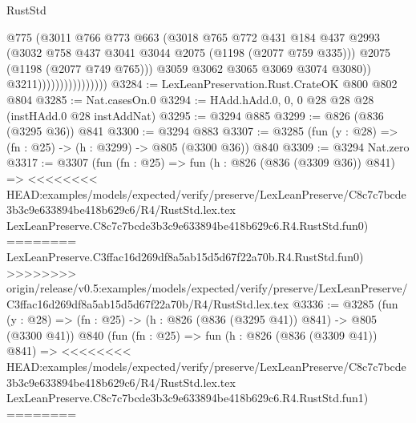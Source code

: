 \begin{lexlean}{RustStd}
\begin{coremodule}
{\begin{coremodule}
{{{{{{{{{                                      @775
                                      (@3011
                                        @766
                                        @773
                                        @663
                                        (@3018
                                          @765
                                          @772
                                          @431
                                          @184
                                          @437
                                          @2993
                                          (@3032
                                            @758
                                            @437
                                            @3041
                                            @3044
                                            @2075
                                            (@1198 (@2077 @759 @335)))
                                          @2075
                                          (@1198 (@2077 @749 @765)))
                                        @3059
                                        @3062
                                        @3065
                                        @3069
                                        @3074
                                        @3080))
                                    @3211))))))))))))))))
@3284 := LexLeanPreservation.Rust.CrateOK @800 @802 @804
@3285 := Nat.casesOn.{0}
@3294 := HAdd.hAdd.{0, 0, 0} @28 @28 @28 (instHAdd.{0} @28 instAddNat)
@3295 := @3294 @885
@3299 := @826 (@836 (@3295 @36)) @841
@3300 := @3294 @883
@3307 := @3285 (fun (y : @28) => (fn : @25) -> (h : @3299) -> @805 (@3300 @36)) @840
@3309 := @3294 Nat.zero
@3317 := @3307
    (fun (fn : @25) =>
    fun (h : @826 (@836 (@3309 @36)) @841) =>
<<<<<<<< HEAD:examples/models/expected/verify/preserve/LexLeanPreserve/C8c7c7bcde3b3c9e633894be418b629c6/R4/RustStd.lex.tex
    LexLeanPreserve.C8c7c7bcde3b3c9e633894be418b629c6.R4.RustStd.fun0)
========
    LexLeanPreserve.C3ffac16d269df8a5ab15d5d67f22a70b.R4.RustStd.fun0)
>>>>>>>> origin/release/v0.5:examples/models/expected/verify/preserve/LexLeanPreserve/C3ffac16d269df8a5ab15d5d67f22a70b/R4/RustStd.lex.tex
@3336 := @3285
    (fun (y : @28) => (fn : @25) -> (h : @826 (@836 (@3295 @41)) @841) -> @805 (@3300 @41))
    @840
    (fun (fn : @25) =>
    fun (h : @826 (@836 (@3309 @41)) @841) =>
<<<<<<<< HEAD:examples/models/expected/verify/preserve/LexLeanPreserve/C8c7c7bcde3b3c9e633894be418b629c6/R4/RustStd.lex.tex
    LexLeanPreserve.C8c7c7bcde3b3c9e633894be418b629c6.R4.RustStd.fun1)
========
}}}}}}}}}
\end{coremodule}}
\end{coremodule}
\end{lexlean}
